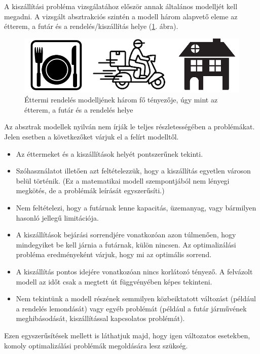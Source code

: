 
A kiszállítási probléma vizsgálatához először annak általános modelljét kell megadni.
A vizsgált absztrakciós szintén a modell három alapvető eleme az étterem, a futár és a rendelés/kiszállítás helye (\ref{fig:generalModel}. ábra).

\begin{figure}[h!]
	\centering
	\includegraphics[scale=0.5]{images/complexModel.png}
	\caption{Éttermi rendelés modelljének három fő tényezője, úgy mint az étterem, a futár és a rendelés helye}
	\label{fig:generalModel}
\end{figure}

Az absztrak modellek nyilván nem írják le teljes részletességében a problémákat.\cite{Image1} \cite{Image2} \cite{Image3}
Jelen esetben a következőket várjuk el a felírt modelltől.
\begin{itemize}
	\item Az éttermeket és a kiszállítások helyét pontszerűnek tekinti.
	\item Szóhasználatot illetően azt feltételezzük, hogy a kiszállítás egyetlen városon belül történik. (Ez a matematikai modell szempontjából nem lényegi megkötés, de a problémák leírását egyszerűsíti.)
	\item Nem feltételezi, hogy a futárnak lenne kapacitás, üzemanyag, vagy bármilyen hasonló jellegű limitációja.
	\item A kiszállítások bejárási sorrendjére vonatkozóan azon túlmenően, hogy mindegyiket be kell járnia a futárnak, külön nincsen. Az optimalizálási probléma eredményeként várjuk, hogy mi az optimális sorrend.
	\item A kiszállítás pontos idejére vonatkozóan nincs korlátozó tényező. A felvázolt modell az időt csak a megtett út függvényében képes tekinteni.
	\item Nem tekintünk a modell részének semmilyen közbeiktatott változást (például a rendelés lemondását) vagy egyéb problémát (például a futár járművének meghibásodását, kiszállítással kapcsolatos problémát).
\end{itemize}
Ezen egyszerűsítések mellett is láthatjuk majd, hogy igen változatos esetekben, komoly optimalizálási problémák megoldására lesz szükség.

